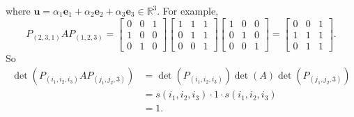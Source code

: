 \documentclass{article}
\begin{document}
\begin{enumerate}
  where $\mathbf{u}
  = \alpha_1 \mathbf{e}_1 + \alpha_2 \mathbf{e}_2 + \alpha_3 \mathbf{e}_3 \in \mathbb{R}^3$.
  For example,
  \[
    P_{(2,3,1)} A P_{(1,2,3)}
    =
    \begin{bmatrix}
      0 & 0 & 1 \\
      1 & 0 & 0 \\
      0 & 1 & 0
    \end{bmatrix}
    \begin{bmatrix}
      1 & 1 & 1 \\
      0 & 1 & 1 \\
      0 & 0 & 1
    \end{bmatrix}
    \begin{bmatrix}
      1 & 0 & 0 \\
      0 & 1 & 0 \\
      0 & 0 & 1
    \end{bmatrix}
    =
    \begin{bmatrix}
      0 & 0 & 1 \\
      1 & 1 & 1 \\
      0 & 1 & 1
    \end{bmatrix}.
  \]
  So
  \begin{align*}
    \det(P_{(i_1,i_2,i_3)} A P_{(j_1,j_2,3)})
    &= \det(P_{(i_1,i_2,i_3)}) \det(A) \det(P_{(j_1,j_2,3)}) \\
    &= s(i_1, i_2, i_3) \cdot 1 \cdot s(i_1, i_2, i_3) \\
    &= 1.
  \end{align*}


\end{enumerate}
\end{document}
